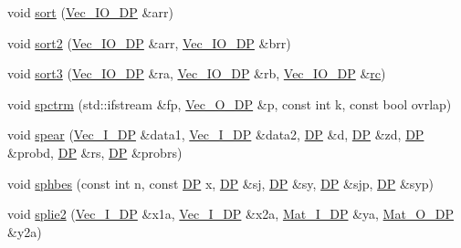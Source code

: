 \begin{DoxyCompactItemize}
\item 
void \mbox{\hyperlink{namespaceNR_a3cdf7710dd309ccdfedbf8a5cc6e3797}{sort}} (\mbox{\hyperlink{namespaceNR_ab293e06a6bf799d8a7ed932b6852bcb8}{Vec\+\_\+\+I\+O\+\_\+\+DP}} \&arr)
\item 
void \mbox{\hyperlink{namespaceNR_aac9ed2f59dae4ff79ef08dd3df8f3120}{sort2}} (\mbox{\hyperlink{namespaceNR_ab293e06a6bf799d8a7ed932b6852bcb8}{Vec\+\_\+\+I\+O\+\_\+\+DP}} \&arr, \mbox{\hyperlink{namespaceNR_ab293e06a6bf799d8a7ed932b6852bcb8}{Vec\+\_\+\+I\+O\+\_\+\+DP}} \&brr)
\item 
void \mbox{\hyperlink{namespaceNR_aacbec42c43f9d847e5f0d00b9d978e99}{sort3}} (\mbox{\hyperlink{namespaceNR_ab293e06a6bf799d8a7ed932b6852bcb8}{Vec\+\_\+\+I\+O\+\_\+\+DP}} \&ra, \mbox{\hyperlink{namespaceNR_ab293e06a6bf799d8a7ed932b6852bcb8}{Vec\+\_\+\+I\+O\+\_\+\+DP}} \&rb, \mbox{\hyperlink{namespaceNR_ab293e06a6bf799d8a7ed932b6852bcb8}{Vec\+\_\+\+I\+O\+\_\+\+DP}} \&\mbox{\hyperlink{namespaceNR_a7d42c86df6be02b1e38a5bf9a51884d8}{rc}})
\item 
void \mbox{\hyperlink{namespaceNR_ae38cea9c6129763058f4b5acebd61ef8}{spctrm}} (std\+::ifstream \&fp, \mbox{\hyperlink{namespaceNR_a970094d23441f8ef6a45282a7eb2103d}{Vec\+\_\+\+O\+\_\+\+DP}} \&p, const int k, const bool ovrlap)
\item 
void \mbox{\hyperlink{namespaceNR_a6bc9d94a243840f52c5520b6e963b9c1}{spear}} (\mbox{\hyperlink{namespaceNR_a9f943da53862537c552e2a770cb170ae}{Vec\+\_\+\+I\+\_\+\+DP}} \&data1, \mbox{\hyperlink{namespaceNR_a9f943da53862537c552e2a770cb170ae}{Vec\+\_\+\+I\+\_\+\+DP}} \&data2, \mbox{\hyperlink{namespaceNR_af6ff762dd605ff477b8e52387253a02a}{DP}} \&d, \mbox{\hyperlink{namespaceNR_af6ff762dd605ff477b8e52387253a02a}{DP}} \&zd, \mbox{\hyperlink{namespaceNR_af6ff762dd605ff477b8e52387253a02a}{DP}} \&probd, \mbox{\hyperlink{namespaceNR_af6ff762dd605ff477b8e52387253a02a}{DP}} \&rs, \mbox{\hyperlink{namespaceNR_af6ff762dd605ff477b8e52387253a02a}{DP}} \&probrs)
\item 
void \mbox{\hyperlink{namespaceNR_ab729e0038cdadb95f6f51d2a3d2844a2}{sphbes}} (const int n, const \mbox{\hyperlink{namespaceNR_af6ff762dd605ff477b8e52387253a02a}{DP}} x, \mbox{\hyperlink{namespaceNR_af6ff762dd605ff477b8e52387253a02a}{DP}} \&sj, \mbox{\hyperlink{namespaceNR_af6ff762dd605ff477b8e52387253a02a}{DP}} \&sy, \mbox{\hyperlink{namespaceNR_af6ff762dd605ff477b8e52387253a02a}{DP}} \&sjp, \mbox{\hyperlink{namespaceNR_af6ff762dd605ff477b8e52387253a02a}{DP}} \&syp)
\item 
void \mbox{\hyperlink{namespaceNR_a670845ceadb2a0b3d7196a9fad1ca893}{splie2}} (\mbox{\hyperlink{namespaceNR_a9f943da53862537c552e2a770cb170ae}{Vec\+\_\+\+I\+\_\+\+DP}} \&x1a, \mbox{\hyperlink{namespaceNR_a9f943da53862537c552e2a770cb170ae}{Vec\+\_\+\+I\+\_\+\+DP}} \&x2a, \mbox{\hyperlink{namespaceNR_a2b8abfda8fffad6ba0a1b5a4c0773dbf}{Mat\+\_\+\+I\+\_\+\+DP}} \&ya, \mbox{\hyperlink{namespaceNR_adc1f8da33094b6bbeb1f5f899515ce54}{Mat\+\_\+\+O\+\_\+\+DP}} \&y2a)

\end{DoxyCompactItemize}
